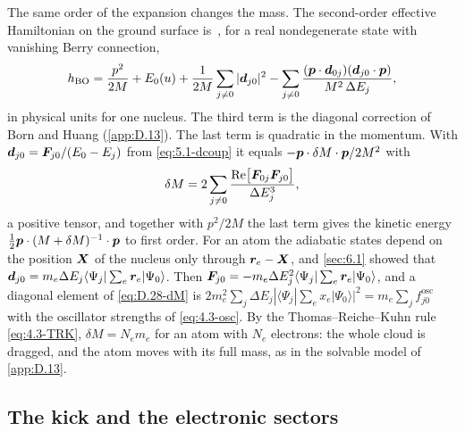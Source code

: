 The same order of the expansion changes the mass. The second-order effective Hamiltonian on the ground surface is~\cite[Eq.~(40)]{panati2003space}, for a real nondegenerate state with vanishing Berry connection,
\begin{equation*}
  h_{\mathrm{BO}} = \frac{p^2}{2M} + E_0(u) + \frac{1}{2M}\sum_{j\neq0}|\bm{d}_{j0}|^2 - \sum_{j\neq0}\frac{(\bm{p}\cdot\bm{d}_{0j})(\bm{d}_{j0}\cdot\bm{p})}{M^2\,\Delta E_j} ,
\end{equation*}
in physical units for one nucleus. The third term is the diagonal correction of Born and Huang (\cref{app:D.13}). The last term is quadratic in the momentum. With $\bm{d}_{j0} = \bm{F}_{j0}/(E_0 - E_j)$ from \cref{eq:5.1-dcoup} it equals $-\bm{p}\cdot\delta M\cdot\bm{p}/2M^2$ with
\begin{equation}
  \delta M = 2\sum_{j\neq0}\frac{\operatorname{Re}\bigl[\bm{F}_{0j}\bm{F}_{j0}\bigr]}{\Delta E_j^3} ,
  \label{eq:D.28-dM}
\end{equation}
a positive tensor, and together with $p^2/2M$ the last term gives the kinetic energy $\tfrac12\bm{p}\cdot(M + \delta M)^{-1}\cdot\bm{p}$ to first order. For an atom the adiabatic states depend on the position $\bm{X}$ of the nucleus only through $\bm{r}_e - \bm{X}$, and \cref{sec:6.1} showed that $\bm{d}_{j0} = m_e\Delta E_j\langle\Psi_j|\sum_e\bm{r}_e|\Psi_0\rangle$. Then $\bm{F}_{j0} = -m_e\Delta E_j^2\langle\Psi_j|\sum_e\bm{r}_e|\Psi_0\rangle$, and a diagonal element of \cref{eq:D.28-dM} is $2m_e^2\sum_j\Delta E_j\allowbreak|\langle\Psi_j|\sum_ex_e|\Psi_0\rangle|^2 = m_e\sum_jf^{\mathrm{osc}}_{j0}$ with the oscillator strengths of \cref{eq:4.3-osc}. By the Thomas--Reiche--Kuhn rule \cref{eq:4.3-TRK}, $\delta M = N_em_e$ for an atom with $N_e$ electrons: the whole cloud is dragged, and the atom moves with its full mass, as in the solvable model of \cref{app:D.13}.

\subsection{The kick and the electronic sectors}


